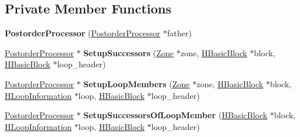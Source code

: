 \subsection*{Private Member Functions}
\begin{DoxyCompactItemize}
\item 
{\bfseries Postorder\+Processor} (\hyperlink{classv8_1_1internal_1_1_postorder_processor}{Postorder\+Processor} $\ast$father)\hypertarget{classv8_1_1internal_1_1_postorder_processor_ac7e582d6d072e1df50dd81fa7d383c3c}{}\label{classv8_1_1internal_1_1_postorder_processor_ac7e582d6d072e1df50dd81fa7d383c3c}

\item 
\hyperlink{classv8_1_1internal_1_1_postorder_processor}{Postorder\+Processor} $\ast$ {\bfseries Setup\+Successors} (\hyperlink{classv8_1_1internal_1_1_zone}{Zone} $\ast$zone, \hyperlink{classv8_1_1internal_1_1_h_basic_block}{H\+Basic\+Block} $\ast$block, \hyperlink{classv8_1_1internal_1_1_h_basic_block}{H\+Basic\+Block} $\ast$loop\+\_\+header)\hypertarget{classv8_1_1internal_1_1_postorder_processor_ae4139e32baf63cd0cba92c741551360a}{}\label{classv8_1_1internal_1_1_postorder_processor_ae4139e32baf63cd0cba92c741551360a}

\item 
\hyperlink{classv8_1_1internal_1_1_postorder_processor}{Postorder\+Processor} $\ast$ {\bfseries Setup\+Loop\+Members} (\hyperlink{classv8_1_1internal_1_1_zone}{Zone} $\ast$zone, \hyperlink{classv8_1_1internal_1_1_h_basic_block}{H\+Basic\+Block} $\ast$block, \hyperlink{classv8_1_1internal_1_1_h_loop_information}{H\+Loop\+Information} $\ast$loop, \hyperlink{classv8_1_1internal_1_1_h_basic_block}{H\+Basic\+Block} $\ast$loop\+\_\+header)\hypertarget{classv8_1_1internal_1_1_postorder_processor_a31b90334db7765f140022934387ee259}{}\label{classv8_1_1internal_1_1_postorder_processor_a31b90334db7765f140022934387ee259}

\item 
\hyperlink{classv8_1_1internal_1_1_postorder_processor}{Postorder\+Processor} $\ast$ {\bfseries Setup\+Successors\+Of\+Loop\+Member} (\hyperlink{classv8_1_1internal_1_1_h_basic_block}{H\+Basic\+Block} $\ast$block, \hyperlink{classv8_1_1internal_1_1_h_loop_information}{H\+Loop\+Information} $\ast$loop, \hyperlink{classv8_1_1internal_1_1_h_basic_block}{H\+Basic\+Block} $\ast$loop\+\_\+header)\hypertarget{classv8_1_1internal_1_1_postorder_processor_a0dbfea7b029d1deefec95a0b8d38ce61}{}\label{classv8_1_1internal_1_1_postorder_processor_a0dbfea7b029d1deefec95a0b8d38ce61}


\end{DoxyCompactItemize}
